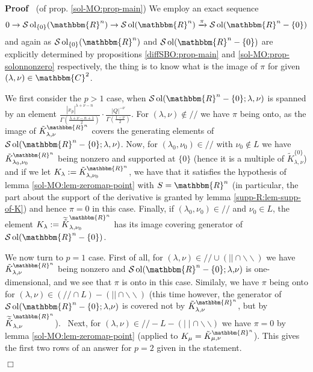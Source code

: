\documentclass{article}
\newcommand{\assign}{:=}
\newcommand{\comma}{{,}}
\newcommand{\nin}{\not\in}
\newcommand{\tmop}[1]{\ensuremath{\operatorname{#1}}}
\newcommand{\um}{-}
\renewenvironment{proof}{\noindent\textbf{Proof\ }}{\hspace*{\fill}$\Box$\medskip}
\theoremstyle{remark}
\begin{document}
\begin{proof}
  (of prop. \ref{sol-MO:prop-main}) We employ an exact sequence
  \[ 0 \rightarrow \mathcal{S} \tmop{ol}_{\{ 0 \}} (\mathbbm{R}^n) \rightarrow
     \mathcal{S} \tmop{ol} (\mathbbm{R}^n) \xrightarrow{\pi} \mathcal{S}
     \tmop{ol} (\mathbbm{R}^n \um \{ 0 \}) \]
  and again as $\mathcal{S} \tmop{ol}_{\{ 0 \}} (\mathbbm{R}^n)$ and
  $\mathcal{S} \tmop{ol} (\mathbbm{R}^n \um \{ 0 \})$ are explicitly
  determined by propositions \ref{diffSBO:prop-main} and
  \ref{sol-MO:prop-solonnonzero} respectively, the thing is to know what is
  the image of $\pi$ for given $(\lambda, \nu) \in \mathbbm{C}^2$.
  
  We first consider the $p > 1$ case, when $\mathcal{S} \tmop{ol}
  (\mathbbm{R}^n - \{ 0 \} ; \lambda, \nu)$ is spanned by an element $\frac{|
  x_p |^{\lambda + \nu - n}}{\Gamma \left( \frac{\lambda + \nu - n + 1}{2}
  \right)} \cdot \frac{| Q |^{- \nu}}{\Gamma \left( \frac{1 - \nu}{2}
  \right)}$. For $(\lambda, \nu) \nin / /$ we have $\pi$ being onto, as the
  image of $\tilde{K}_{\lambda, \nu}^{\mathbbm{R}^n}$ covers the generating
  elements of $\mathcal{S} \tmop{ol} (\mathbbm{R}^n - \{ 0 \} ; \lambda,
  \nu)$. Now, for $(\lambda_0, \nu_0) \in / /$ with $\nu_0 \nin L$ we have
  $\tilde{K}_{\lambda_0, \nu_0}^{\mathbbm{R}^n}$ being nonzero and supported
  at $\{ 0 \}$ (hence it is a multiple of $\tilde{K}_{\lambda, \nu}^{\{ 0
  \}}$) and if we let $K_{\lambda} \assign \tilde{K}_{\lambda,
  \nu_0}^{\mathbbm{R}^n}$, we have that it satisfies the hypothesis of lemma
  \ref{sol-MO:lem-zeromap-point} with $S =\mathbbm{R}^n$ (in particular, the
  part about the support of the derivative is granted by lemma
  \ref{supp-R:lem-supp-of-K}) and hence $\pi = 0$ in this case. Finally, if
  $(\lambda_0, \nu_0) \in / /$ and $\nu_0 \in L$, the element $K_{\lambda}
  \assign \widetilde{\tilde{K}}_{\lambda, \nu_0}^{\mathbbm{R}^n}$ has its
  image covering generator of $\mathcal{S} \tmop{ol} (\mathbbm{R}^n \um \{ 0
  \})$.
  
  We now turn to $p = 1$ case. First of all, for $(\lambda, \nu) \in / / \cup
  (| | \cap \backslash\backslash)$ we have $\tilde{K}_{\lambda,
  \nu}^{\mathbbm{R}^n}$ being nonzero and $\mathcal{S} \tmop{ol}
  (\mathbbm{R}^n - \{ 0 \} ; \lambda \comma \nu)$ is one-dimensional, and we
  see that $\pi$ is onto in this case. Similaly, we have $\pi$ being onto for
  $(\lambda, \nu) \in (/ / \cap L) - (| | \cap \backslash\backslash)$ (this
  time however, the generator of $\mathcal{S} \tmop{ol} (\mathbbm{R}^n - \{ 0
  \} ; \lambda \comma \nu)$ is covered not by $\tilde{K}_{\lambda,
  \nu}^{\mathbbm{R}^n}$, but by $\widetilde{\tilde{K}}_{\lambda,
  \nu}^{\mathbbm{R}^n}$). \ Next, for $(\lambda, \nu) \in / / - L - (\mid
  \mid \cap \backslash\backslash)$ we have $\pi = 0$ by lemma
  \ref{sol-MO:lem-zeromap-point} (applied to $K_{\mu} = \tilde{K}_{\mu,
  \nu}^{\mathbbm{R}^n}$). This gives the first two rows of an answer for $p =
  2$ given in the statement.
  

\end{proof}
\end{document}
